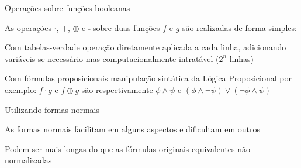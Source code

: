 \expandafter\documentclass\expandafter[table, usenames, svgnames, dvipsnames,14pt, \classopts]{beamer}
\begin{document}
\begin{frame}{Operações sobre funções booleanas}

    As operações $\cdot$, $+$, $\oplus$ e $\bar{~}$ sobre duas funções $f$ e $g$ são realizadas de forma simples:

    \begin{outline}
        \1 Com tabelas-verdade
            \2[-] operação diretamente aplicada a cada linha, adicionando variáveis se necessário
            \2[-] mas computacionalmente intratável ($2^n$ linhas)

        \vspace{1em}
            
        \1 Com fórmulas proposicionais
            \2[-] manipulação sintática da Lógica Proposicional
            \2[-] por exemplo: $f \cdot g$ e $f \oplus g$ são respectivamente $\phi \land \psi$ e $(\phi \land \lnot{\psi}) \lor (\lnot{\phi} \land \psi)$
    \end{outline}

\end{frame}

\begin{frame}{Utilizando formas normais}

    \begin{outline}
        \1 As formas normais facilitam em alguns aspectos
            \2[-] e dificultam em outros
        
        \vspace{1em}
        
        \1 Podem ser mais longas do que as fórmulas originais equivalentes não-normalizadas
    \end{outline}

\end{frame}
\end{document}

